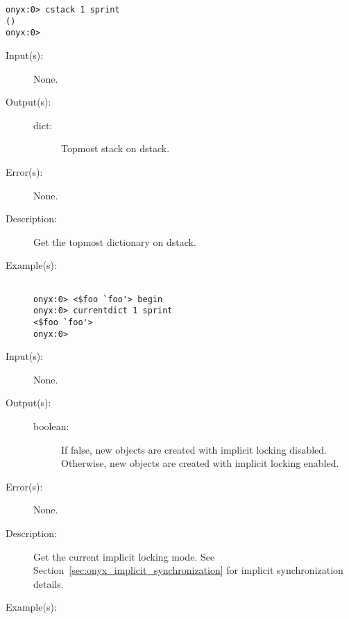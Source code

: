 \begin{description}
\begin{description}
\begin{verbatim}
onyx:0> cstack 1 sprint
()
onyx:0>
		\end{verbatim}
	\end{description}
\label{systemdict:currentdict}
\item[{\onyxop{--}{currentdict}{dict}}: ]
	\begin{description}\item[]
	\item[Input(s): ] None.
	\item[Output(s): ]
		\begin{description}\item[]
		\item[dict: ]
			Topmost stack on dstack.
		\end{description}
	\item[Error(s): ] None.
	\item[Description: ]
		Get the topmost dictionary on dstack.
	\item[Example(s): ]\begin{verbatim}

onyx:0> <$foo `foo'> begin
onyx:0> currentdict 1 sprint
<$foo `foo'>
onyx:0>
		\end{verbatim}
	\end{description}
\label{systemdict:currentlocking}
\item[{\onyxop{--}{currentlocking}{boolean}}: ]
	\begin{description}\item[]
	\item[Input(s): ] None.
	\item[Output(s): ]
		\begin{description}\item[]
		\item[boolean: ]
			If false, new objects are created with implicit locking
			disabled.  Otherwise, new objects are created with
			implicit locking enabled.
		\end{description}
	\item[Error(s): ] None.
	\item[Description: ]
		Get the current implicit locking mode.  See
		Section~\ref{sec:onyx_implicit_synchronization} for implicit
		synchronization details.
	\item[Example(s): ]\begin{verbatim}


\end{verbatim}
\end{description}
\end{description}
